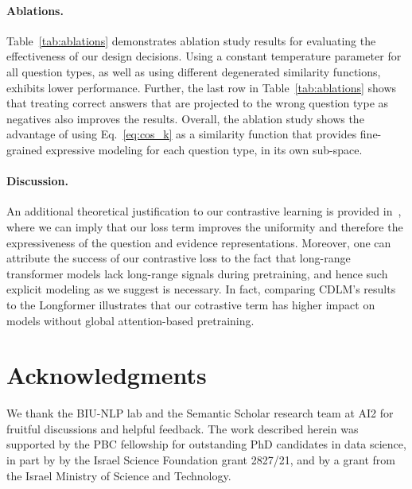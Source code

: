 \paragraph{Ablations.} Table~\ref{tab:ablations} demonstrates ablation study results for evaluating the effectiveness of our design decisions. Using a constant temperature parameter for all question types, as well as using different degenerated similarity functions, exhibits lower performance. Further, the last row in Table~\ref{tab:ablations} shows that treating correct answers that are projected to the wrong question type as negatives also improves the results.
Overall, the ablation study shows the advantage of using Eq.~\ref{eq:cos_k} as a similarity function that provides fine-grained expressive modeling for each question type, in its own sub-space. 

\paragraph{Discussion.} An additional theoretical justification to our contrastive learning is provided in~\cite{gao-etal-2021-simcse}, where we can imply that our loss term improves the uniformity and therefore the expressiveness of the question and evidence representations. Moreover, one can attribute the success of our contrastive loss to the fact that long-range transformer models lack long-range signals during pretraining, and hence such explicit modeling as we suggest is necessary. In fact, comparing CDLM's results to the Longformer illustrates that our cotrastive term has higher impact on models without global attention-based pretraining.  





\section*{Acknowledgments}
We thank the BIU-NLP lab and the Semantic Scholar research team at AI2 for fruitful discussions and helpful feedback.
The work described herein was supported by the PBC fellowship for outstanding PhD candidates in data science, in part by by the Israel Science Foundation grant 2827/21, and by a grant from the Israel Ministry of Science and Technology.
	
